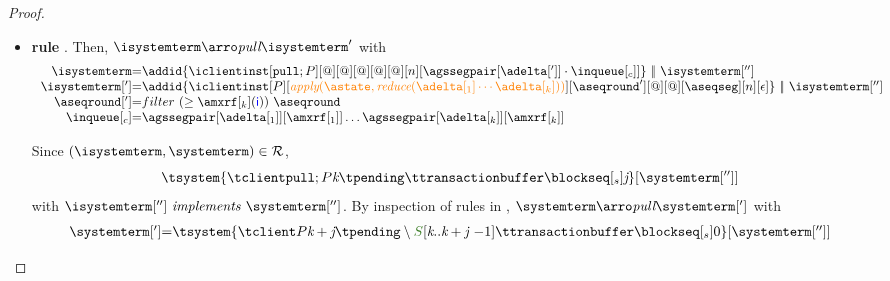 \begin{proof}
\begin{itemize}
\begin{itemize}
\begin{itemize}
						\end{itemize}
					
	
	\item {\bf rule }. Then, $\isystemterm  \arroi{\pulltran} \isystemterm '$ with 
				\[\begin{array}{r@{=}l}
					\isystemterm & \addid{\iclientinst[\tpullins][@]
						[@]%
						[@][@][@][n][{\agssegpair[{\adelta[']}]}\cdot\inclient]}
								\ \bigpar \ \isystemterm['']
					\\
					\isystemterm['] & \addid{\iclientinst[P]
						 [\iapply{\known}{\ireduce{\adelta[_1]\cdots\adelta[_k]}}]
						 [\aseqround']
						 [@][@]
						 [{\receivebuffer}][n][\epsilon]}\ \bigpar \ \isystemterm['']	\\
					   \aseqround['] & filter\ (\geq \amxrf[_k](\cid)) \ \aseqround \\
						\inclient & \agssegpair[{\adelta[_1]}][{\amxrf[_1]}]\ldots \agssegpair[{\adelta[_k]}][{\amxrf[_k]}]
				  \end{array}
				\]
		
				Since $(\isystemterm,\systemterm)\in \mathcal{R}$,
				\[\tsystem{\tclienti{\tpullins}{\tknown}{\tpending}{\ttransactionbuffer}{\tsent}{\treceivebuffer}}[{\systemterm['']}] \]
				with $\implements{\isystemterm['']}{\systemterm['']}$. By inspection of rules in \figref{}, 
				$\systemterm \arroi{\pulltran} \systemterm[']$ with
				\[\begin{array}{r@{=}l}
					\systemterm['] &  \tsystem{\tclienti{\tprogram}{\tknown+\treceivebuffer}{\tpending \setminus \queuemessage[\tknown .. \tknown + \treceivebuffer {\ -1}]}{\ttransactionbuffer}{\tsent}{0}}[{\systemterm['']}]	
				  \end{array}		
				\]
				

\end{itemize}
\end{itemize}
\end{proof}
